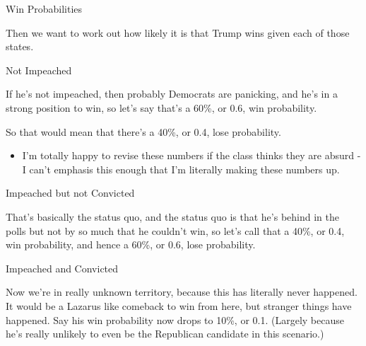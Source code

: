 \documentclass[
  ignorenonframetext,
]{beamer}
\providecommand{\tightlist}{%
  \setlength{\itemsep}{0pt}\setlength{\parskip}{0pt}}
\renewcommand{\,}{\text{, }}
\begin{document}
\begin{frame}{Win Probabilities}
\protect\hypertarget{win-probabilities}{}

Then we want to work out how likely it is that Trump wins given each of
those states.

\end{frame}

\begin{frame}{Not Impeached}
\protect\hypertarget{not-impeached}{}

If he's not impeached, then probably Democrats are panicking, and he's
in a strong position to win, so let's say that's a 60\%, or 0.6, win
probability.

\bigskip

So that would mean that there's a 40\%, or 0.4, lose probability.

\begin{itemize}[<+->]
\tightlist
\item
  I'm totally happy to revise these numbers if the class thinks they are
  absurd - I can't emphasis this enough that I'm literally making these
  numbers up.
\end{itemize}

\end{frame}

\begin{frame}{Impeached but not Convicted}
\protect\hypertarget{impeached-but-not-convicted}{}

That's basically the status quo, and the status quo is that he's behind
in the polls but not by so much that he couldn't win, so let's call that
a 40\%, or 0.4, win probability, and hence a 60\%, or 0.6, lose
probability.

\end{frame}

\begin{frame}{Impeached and Convicted}
\protect\hypertarget{impeached-and-convicted}{}

Now we're in really unknown territory, because this has literally never
happened. It would be a Lazarus like comeback to win from here, but
stranger things have happened. Say his win probability now drops to
10\%, or 0.1. (Largely because he's really unlikely to even be the
Republican candidate in this scenario.)

\end{frame}
\end{document}
